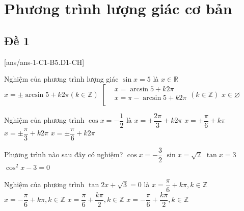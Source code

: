 \section{Phương trình lượng giác cơ bản}

\subsection{Đề 1}
[ans/ans-1-C1-B5.D1-CH]
\caulc
\begin{ex}%
	Nghiệm của phương trình lượng giác $\sin x=5$ là
	\choice
	{$x\in \mathbb{R}$}
	{$x=\pm \arcsin 5+k2\pi \left( k\in \mathbb{Z} \right)$}
	{$\left[ \begin{aligned}
		  & x=\arcsin 5+k2\pi  \\ 
		 & x=\pi -\arcsin 5+k2\pi  \\ 
		\end{aligned} \right.\left( k\in \mathbb{Z} \right)$}
	{\True $x\in \varnothing $}
\end{ex}

\begin{ex}%
	Nghiệm của phương trình $\cos x=-\dfrac{1}{2}$ là
	\choice
	{\True $x=\pm \dfrac{2\pi }{3}+k2\pi $}
	{$x=\pm \dfrac{\pi }{6}+k\pi $}
	{$x=\pm \dfrac{\pi }{3}+k2\pi $}
	{$x=\pm \dfrac{\pi }{6}+k2\pi $}
\end{ex}

\begin{ex}%
	Phương trình nào sau đây có nghiệm?
	\choice
	{$\cos x=-\dfrac{3}{2}$}
	{$\sin x=\sqrt{2}$}
	{\True $\tan x=3$}
	{${\cos }^{2}x-3=0$}
\end{ex}

\begin{ex}%
	Nghiệm của phương trình $\tan 2x+\sqrt{3}=0$ là
	\choice
	{$x=\dfrac{\pi }{6}+k\pi ,k\in \mathbb{Z}$}
	{$x=-\dfrac{\pi }{6}+k\pi ,k\in \mathbb{Z}$}
	{$x=\dfrac{\pi }{6}+\dfrac{k\pi }{2},k\in \mathbb{Z}$}
	{\True $x=-\dfrac{\pi }{6}+\dfrac{k\pi }{2},k\in \mathbb{Z}$}
\end{ex}

